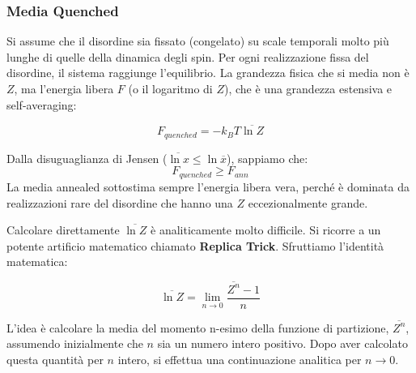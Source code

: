 \subsubsection{Media Quenched}
Si assume che il disordine sia fissato (congelato) su scale temporali molto più lunghe di quelle della dinamica degli spin. Per ogni realizzazione fissa del disordine, il sistema raggiunge l'equilibrio.
La grandezza fisica che si media non è $Z$, ma l'energia libera $F$ (o il logaritmo di $Z$), che è una grandezza estensiva e self-averaging:


\begin{equation}
    F_{quenched} = -k_B T \overline{\ln Z} 
\end{equation}

\noindent Dalla disuguaglianza di Jensen ($\overline{\ln x} \le \ln \overline{x}$), sappiamo che:
\begin{equation}
    F_{quenched} \ge F_{ann}
\end{equation}
La media annealed sottostima sempre l'energia libera vera, perché è dominata da realizzazioni rare del disordine che hanno una $Z$ eccezionalmente grande.

\noindent Calcolare direttamente $\overline{\ln Z}$ è analiticamente molto difficile. Si ricorre a un potente artificio matematico chiamato \textbf{Replica Trick}.
Sfruttiamo l'identità matematica:

\begin{equation}
    \overline{\ln Z} = \lim_{n \to 0} \frac{\overline{Z^n} - 1}{n}
\end{equation}

L'idea è calcolare la media del momento n-esimo della funzione di partizione, $\overline{Z^n}$, assumendo inizialmente che $n$ sia un numero intero positivo.
Dopo aver calcolato questa quantità per $n$ intero, si effettua una continuazione analitica per $n \to 0$. 
